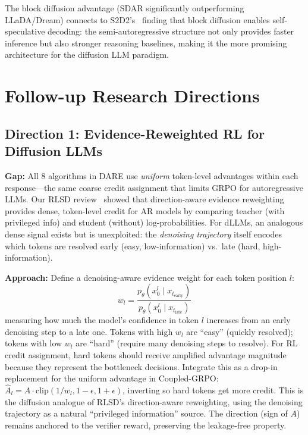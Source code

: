 \documentclass[11pt]{article}
\begin{document}
The block diffusion advantage (SDAR significantly outperforming LLaDA/Dream) connects to S2D2's~\cite{s2d2} finding that block diffusion enables self-speculative decoding: the semi-autoregressive structure not only provides faster inference but also stronger reasoning baselines, making it the more promising architecture for the diffusion LLM paradigm.

\section{Follow-up Research Directions}

\subsection{Direction 1: Evidence-Reweighted RL for Diffusion LLMs}

\textbf{Gap:} All 8 algorithms in DARE use \textit{uniform} token-level advantages within each response---the same coarse credit assignment that limits GRPO for autoregressive LLMs. Our RLSD review~\cite{rlsd} showed that direction-aware evidence reweighting provides dense, token-level credit for AR models by comparing teacher (with privileged info) and student (without) log-probabilities. For dLLMs, an analogous dense signal exists but is unexploited: the \textit{denoising trajectory} itself encodes which tokens are resolved early (easy, low-information) vs.\ late (hard, high-information).

\textbf{Approach:} Define a denoising-aware evidence weight for each token position $l$:
\begin{equation}
    w_l = \frac{p_\theta(x_0^l \mid x_{t_{\mathrm{early}}})}{p_\theta(x_0^l \mid x_{t_{\mathrm{late}}})}
\end{equation}
measuring how much the model's confidence in token $l$ increases from an early denoising step to a late one. Tokens with high $w_l$ are ``easy'' (quickly resolved); tokens with low $w_l$ are ``hard'' (require many denoising steps to resolve). For RL credit assignment, hard tokens should receive amplified advantage magnitude because they represent the bottleneck decisions. Integrate this as a drop-in replacement for the uniform advantage in Coupled-GRPO:
$\hat{A}_l = A \cdot \mathrm{clip}(1/w_l, 1 - \epsilon, 1 + \epsilon)$,
inverting so hard tokens get more credit. This is the diffusion analogue of RLSD's direction-aware reweighting, using the denoising trajectory as a natural ``privileged information'' source. The direction (sign of $A$) remains anchored to the verifier reward, preserving the leakage-free property.
\end{document}
